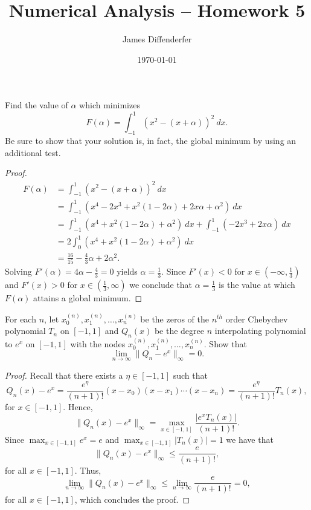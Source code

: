\documentclass[8pt]{article}
\title{Numerical Analysis -- Homework 5}
\author{James Diffenderfer}
\date{\today}
\theoremstyle{definition}
\newenvironment{exercise}[1]
  {\renewcommand\theinnerexercise{#1}\innerexercise}
  {\endinnerexercise}
\begin{document}
\maketitle


\begin{exercise}{1}
Find the value of $\alpha$ which minimizes $$F(\alpha) = \int_{-1}^{1} \left( x^2 - (x + \alpha) \right)^2 \ dx.$$ Be sure to show that your solution is, in fact, the global minimum by using an additional test.
\end{exercise}

\begin{proof}
\begin{align*}
F(\alpha) &= \int_{-1}^{1} \left( x^2 - (x + \alpha) \right)^2 \ dx \\
&= \int_{-1}^{1} \left( x^4 - 2 x^3 + x^2 (1 - 2 \alpha) + 2x \alpha + \alpha^2  \right) \ dx \\
&= \int_{-1}^{1} \left( x^4 + x^2 (1 - 2 \alpha) + \alpha^2  \right) \ dx + \int_{-1}^{1} \left(- 2 x^3 + 2x \alpha \right) \ dx \\
&= 2 \int_{0}^{1} \left( x^4 + x^2 (1 - 2 \alpha) + \alpha^2  \right) \ dx \\
&= \frac{16}{15} - \frac{4}{3} \alpha + 2 \alpha^2.
\end{align*}
Solving $F'(\alpha) = 4 \alpha - \frac{4}{3} = 0$ yields $\alpha = \frac{1}{3}$. Since $F'(x) < 0$ for $x \in \left( -\infty, \frac{1}{3} \right)$ and $F'(x) > 0$ for $x \in \left( \frac{1}{3}, \infty \right)$ we conclude that $\alpha = \frac{1}{3}$ is the value at which $F(\alpha)$ attains a global minimum.
\end{proof}



\begin{exercise}{2}
For each $n$, let $x_{0}^{(n)}, x_{1}^{(n)}, \ldots, x_{n}^{(n)}$ be the zeros of the $n^{th}$ order Chebychev polynomial $T_n$ on $[-1, 1]$ and $Q_n (x)$ be the degree $n$ interpolating polynomial to $e^x$ on $[-1, 1]$ with the nodes $x_{0}^{(n)}, x_{1}^{(n)}, \ldots, x_{n}^{(n)}$. Show that $$\lim_{n \to \infty} \| Q_n - e^x \|_{\infty} = 0.$$
\end{exercise}

\begin{proof}
Recall that there exists a $\eta \in [-1, 1]$ such that $$Q_n (x) - e^x = \frac{e^{\eta}}{(n + 1)!} (x - x_0)(x - x_1) \cdots (x - x_n) = \frac{e^{\eta}}{(n + 1)!} T_n (x),$$ for $x \in [-1, 1]$. Hence, $$\| Q_n (x) - e^x \|_{\infty} = \max_{x \in [-1, 1]} \frac{\left| e^x T_n (x) \right|}{(n + 1)!}.$$ Since $\max_{x \in [-1, 1]} e^x = e$ and $\max_{x \in [-1, 1]} \left| T_n (x) \right| = 1$ we have that $$\| Q_n (x) - e^x \|_{\infty} \leq \frac{e}{(n + 1)!},$$ for all $x \in [-1, 1]$. Thus, $$\lim_{n \to \infty} \| Q_n (x) - e^x \|_{\infty} \leq \lim_{n \to \infty} \frac{e}{(n + 1)!} = 0,$$ for all $x \in [-1, 1]$, which concludes the proof.
\end{proof}
\end{document}
